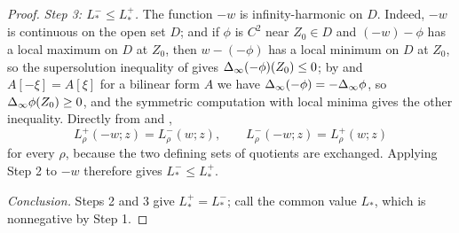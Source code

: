 \begin{proof}
\emph{Step 3: $L_*^-\le L_*^+$.}
The function $-w$ is infinity-harmonic on $D$. Indeed, $-w$ is continuous on the
open set $D$; and if $\phi$ is $C^2$ near $Z_0\in D$ and $(-w)-\phi$ has a local
maximum on $D$ at $Z_0$, then $w-(-\phi)$ has a local minimum on $D$ at $Z_0$, so
the supersolution inequality of  gives
$\Delta_{\infty}(-\phi)(Z_0)\le0$; by  and
$A[-\xi]=A[\xi]$ for a bilinear form $A$ we have
$\Delta_{\infty}(-\phi)=-\Delta_{\infty}\phi$, so $\Delta_{\infty}\phi(Z_0)\ge0$, and the symmetric
computation with local minima gives the other inequality. Directly from
 and
,
\[
  L_\rho^+(-w;z)=L_\rho^-(w;z),\qquad L_\rho^-(-w;z)=L_\rho^+(w;z)
\]
for every $\rho$, because the two defining sets of quotients are exchanged.
Applying Step 2 to $-w$ therefore gives $L_*^-\le L_*^+$.

\emph{Conclusion.} Steps 2 and 3 give $L_*^+=L_*^-$; call the common value
$L_*$, which is nonnegative by Step 1.
\end{proof}
